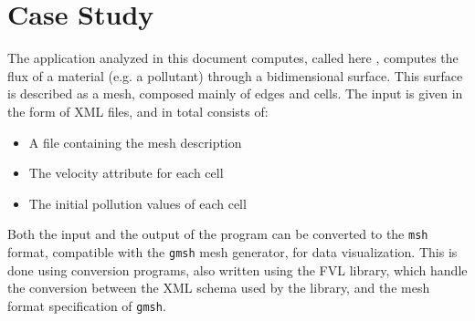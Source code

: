 \section{Case Study}

The application analyzed in this document computes, called here \polu, computes the flux of a material (e.g. a pollutant) through a bidimensional surface. This surface is described as a mesh, composed mainly of edges and cells. The input is given in the form of XML files, and in total consists of:

\begin{itemize}
	\item A file containing the mesh description
	\item The velocity attribute for each cell
	\item The initial pollution values of each cell
\end{itemize}

Both the input and the output of the program can be converted to the \texttt{msh} format, compatible with the \texttt{gmsh} mesh generator, for data visualization. This is done using conversion programs, also written using the FVL library, which handle the conversion between the XML schema used by the library, and the mesh format specification of \texttt{gmsh}.



